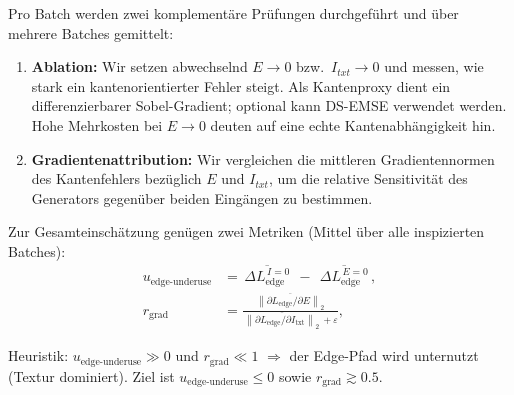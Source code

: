 Pro Batch werden zwei komplementäre Prüfungen durchgeführt und über mehrere Batches gemittelt:
\begin{enumerate}
    \item \textbf{Ablation:} Wir setzen abwechselnd $E\!\to\!0$ bzw.\ $I_{txt}\!\to\!0$ und messen, wie stark ein kantenorientierter Fehler steigt. Als Kantenproxy dient ein differenzierbarer Sobel-Gradient; optional kann \ac{DS-EMSE} verwendet werden. Hohe Mehrkosten bei $E\!\to\!0$ deuten auf eine echte Kantenabhängigkeit hin.
    \item \textbf{Gradientenattribution:} Wir vergleichen die mittleren Gradienten\-normen des Kantenfehlers bezüglich $E$ und $I_{txt}$, um die relative Sensitivität des Generators gegenüber beiden Eingängen zu bestimmen.
\end{enumerate}

Zur Gesamteinschätzung genügen zwei Metriken (Mittel über alle inspizierten Batches):
\begin{align}
    u_{\text{edge-underuse}}
    &= \overline{\,\Delta L_{\text{edge}}^{\,I=0}\,}
       \;-\;
       \overline{\,\Delta L_{\text{edge}}^{\,E=0}\,},
       \label{eq:edge-underuse}\\[2pt]
    r_{\text{grad}}
    &= \frac{ \overline{\,\left\lVert \partial L_{\text{edge}} / \partial E \right\rVert_{2}\,} }
            { \overline{\,\left\lVert \partial L_{\text{edge}} / \partial I_{\text{txt}} \right\rVert_{2}\,} + \varepsilon },
       \label{eq:grad-ratio}
\end{align}

Heuristik: $u_{\text{edge-underuse}} \gg 0$ und $r_{\text{grad}} \ll 1$ $\Rightarrow$ der Edge-Pfad wird unter\-nutzt (Textur dominiert). Ziel ist $u_{\text{edge-underuse}} \le 0$ sowie $r_{\text{grad}} \gtrsim 0{.}5$.

\newpage


